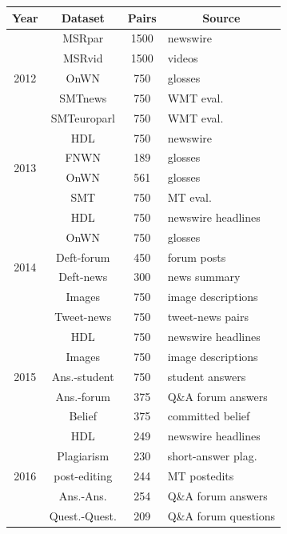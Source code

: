 \begin{enumerate}
 \begin{table}[ht!]
 	\centering
 	\begin{tabular}{c|c|c|l}
 		\hline
 		\multicolumn{1}{c|}{\textbf{Year}} & 
 		\multicolumn{1}{c|}{\textbf{Dataset}} & 
 		\multicolumn{1}{c|}{\textbf{Pairs}} & 
 		\multicolumn{1}{c}{\textbf{Source}} \\
 		\hline
 		 \multirow{5}{*}{2012 \cite{agirre-etal-2012-semeval}} & MSRpar & 1500 & newswire \\
 		 & MSRvid & 1500 & videos \\
 		 & OnWN & 750 & glosses \\
 		 & SMTnews & 750 & WMT eval. \\
 		 & SMTeuroparl & 750 & WMT eval. \\
 		\hline
 		 \multirow{4}{*}{2013 \cite{agirre-etal-2013-sem}} & HDL & 750 & newswire \\
 		 & FNWN & 189 & glosses \\
 		 & OnWN & 561 & glosses \\
 		 & SMT & 750 & MT eval. \\
 		\hline
 		 \multirow{6}{*}{2014 \cite{agirre-etal-2014-semeval}} & HDL & 750 & newswire headlines \\
 		 & OnWN & 750 & glosses \\
 		 & Deft-forum & 450 & forum posts \\
 		 & Deft-news & 300 & news summary \\
 		 & Images & 750 & image descriptions \\
 		 & Tweet-news & 750 & tweet-news pairs \\
 		\hline
 		 \multirow{5}{*}{2015 \cite{agirre-etal-2015-semeval} } & HDL & 750 & newswire headlines \\
 		 & Images & 750 & image descriptions \\
 		& Ans.-student & 750 & student answers \\
 		 & Ans.-forum & 375 & Q\&A forum answers \\
 		 & Belief & 375 & committed belief \\
 		\hline
 		 \multirow{5}{*}{2016 \cite{agirre-etal-2016-semeval} } & HDL & 249 & newswire headlines \\
 		 & Plagiarism & 230 & short-answer plag. \\
 		& post-editing & 244 & MT postedits \\
 		 & Ans.-Ans. & 254 & Q\&A forum answers \\
 		 & Quest.-Quest. & 209 & Q\&A forum questions \\

\end{tabular}
\end{table}
\end{enumerate}
